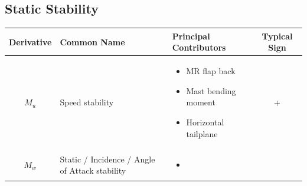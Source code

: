 \documentclass[
]{book}
\providecommand{\tightlist}{%
  \setlength{\itemsep}{0pt}\setlength{\parskip}{0pt}}
\begin{document}
\hypertarget{static-stability}{%
\subsection{Static Stability}\label{static-stability}}

\begin{longtable}[]{@{}cllc@{}}
\toprule
\begin{minipage}[b]{0.16\columnwidth}\centering
\textbf{Derivative}\strut
\end{minipage} & \begin{minipage}[b]{0.29\columnwidth}\raggedright
\textbf{Common Name}\strut
\end{minipage} & \begin{minipage}[b]{0.27\columnwidth}\raggedright
\textbf{Principal Contributors}\strut
\end{minipage} & \begin{minipage}[b]{0.18\columnwidth}\centering
\textbf{Typical Sign}\strut
\end{minipage}\tabularnewline
\midrule
\endhead
\begin{minipage}[t]{0.16\columnwidth}\centering
\(M_u\)\strut
\end{minipage} & \begin{minipage}[t]{0.29\columnwidth}\raggedright
Speed stability\strut
\end{minipage} & \begin{minipage}[t]{0.27\columnwidth}\raggedright
\begin{itemize}
\tightlist
\item
  MR flap back
\item
  Mast bending moment
\item
  Horizontal tailplane
\end{itemize}\strut
\end{minipage} & \begin{minipage}[t]{0.18\columnwidth}\centering
+\strut
\end{minipage}\tabularnewline
\begin{minipage}[t]{0.16\columnwidth}\centering
\(M_w\)\strut
\end{minipage} & \begin{minipage}[t]{0.29\columnwidth}\raggedright
Static / Incidence /
Angle of Attack stability\strut
\end{minipage} & \begin{minipage}[t]{0.27\columnwidth}\raggedright
\begin{itemize}
\tightlist
\item

\end{itemize}
\end{minipage}
\end{longtable}
\end{document}
